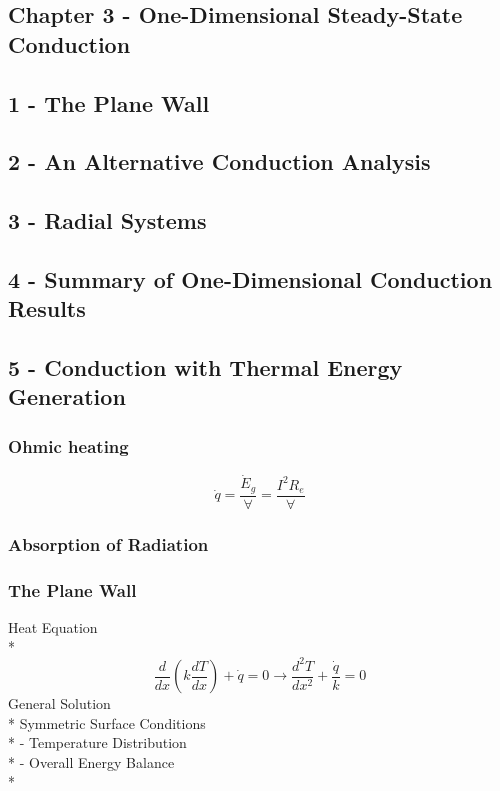 \documentclass[10pt,landscape]{article}
\begin{document}
\begin{multicols}{3}
\section{Chapter 3 - One-Dimensional Steady-State Conduction}
\subsection{1 - The Plane Wall}
\subsection{2 - An Alternative Conduction Analysis}
\subsection{3 - Radial Systems}
\subsection{4 - Summary of One-Dimensional Conduction Results}
\subsection{5 - Conduction with Thermal Energy Generation}
\subsubsection{Ohmic heating}
\begin{equation}
    \dot{q}=\frac{\dot{E}_g}{\forall}=\frac{I^2R_e}{\forall}
\end{equation}
\subsubsection{Absorption of Radiation}
\subsubsection{The Plane Wall}
Heat Equation\\*
\begin{equation}
    \frac{d}{dx}(k\frac{dT}{dx})+\dot{q}=0\rightarrow\frac{d^2T}{dx^2}+\frac{\dot{q}}{k}=0
\end{equation}
General Solution\\*
Symmetric Surface Conditions\\*
- Temperature Distribution\\*
- Overall Energy Balance\\*

\end{multicols}
\end{document}
